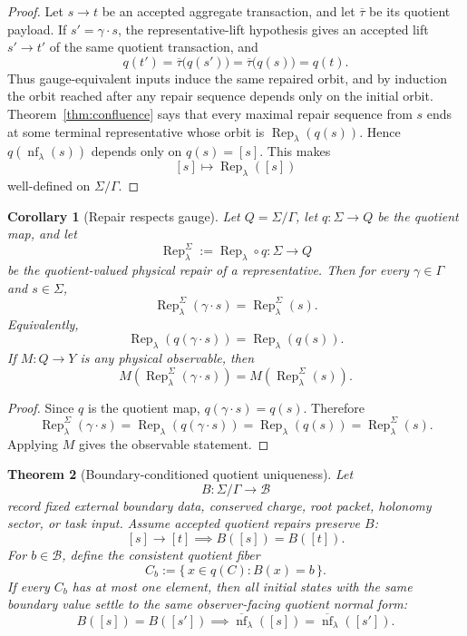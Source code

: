 \documentclass[11pt]{article}
\newtheorem{theorem}{Theorem}[section]
\newtheorem{corollary}[theorem]{Corollary}
\theoremstyle{remark}
\theoremstyle{plain}
\begin{document}
\begin{proof}
Let \(s\to t\) be an accepted aggregate transaction, and let \(\overline\tau\) be its quotient
payload. If \(s'=\gamma\cdot s\), the representative-lift hypothesis gives an accepted lift
\(s'\to t'\) of the same quotient transaction, and
\[
q(t')
=
\overline\tau\bigl(q(s')\bigr)
=
\overline\tau\bigl(q(s)\bigr)
=
q(t).
\]
Thus gauge-equivalent inputs induce the same repaired orbit, and by induction the orbit reached
after any repair sequence depends only on the initial orbit. Theorem~\ref{thm:confluence} says that
every maximal repair sequence from \(s\) ends at some terminal representative whose orbit is
\(\operatorname{Rep}_\lambda(q(s))\). Hence
\(q(\operatorname{nf}_\lambda(s))\) depends only on \(q(s)=[s]\). This makes
\[
[s]\longmapsto \operatorname{Rep}_\lambda([s])
\]
well-defined on $\Sigma/\Gamma$.
\end{proof}

\begin{corollary}[Repair respects gauge]\label{cor:repair-respects-gauge}
Let \(Q=\Sigma/\Gamma\), let \(q:\Sigma\to Q\) be the quotient map, and let
\[
\operatorname{Rep}^{\Sigma}_\lambda
:=
\operatorname{Rep}_\lambda\circ q
:
\Sigma\to Q
\]
be the quotient-valued physical repair of a representative.  Then for every
\(\gamma\in\Gamma\) and \(s\in\Sigma\),
\[
\operatorname{Rep}^{\Sigma}_\lambda(\gamma\cdot s)
=
\operatorname{Rep}^{\Sigma}_\lambda(s).
\]
Equivalently,
\[
\operatorname{Rep}_\lambda(q(\gamma\cdot s))
=
\operatorname{Rep}_\lambda(q(s)).
\]
If \(M:Q\to Y\) is any physical observable, then
\[
M(\operatorname{Rep}^{\Sigma}_\lambda(\gamma\cdot s))
=
M(\operatorname{Rep}^{\Sigma}_\lambda(s)).
\]
\end{corollary}

\begin{proof}
Since \(q\) is the quotient map, \(q(\gamma\cdot s)=q(s)\).  Therefore
\[
\operatorname{Rep}^{\Sigma}_\lambda(\gamma\cdot s)
=
\operatorname{Rep}_\lambda(q(\gamma\cdot s))
=
\operatorname{Rep}_\lambda(q(s))
=
\operatorname{Rep}^{\Sigma}_\lambda(s).
\]
Applying \(M\) gives the observable statement.
\end{proof}

\begin{theorem}[Boundary-conditioned quotient uniqueness]\label{thm:boundary-conditioned-uniqueness}
Let
\[
B:\Sigma/\Gamma\to\mathcal B
\]
record fixed external boundary data, conserved charge, root packet, holonomy sector, or task
input. Assume accepted quotient repairs preserve \(B\):
\[
[s]\to [t]\implies B([s])=B([t]).
\]
For \(b\in\mathcal B\), define the consistent quotient fiber
\[
C_b:=\{\,x\in q(C):B(x)=b\,\}.
\]
If every \(C_b\) has at most one element, then all initial states with the same boundary value
settle to the same observer-facing quotient normal form:
\[
B([s])=B([s'])\implies
\overline{\operatorname{nf}}_\lambda([s])
=
\overline{\operatorname{nf}}_\lambda([s']).
\]
\end{theorem}
\end{document}
